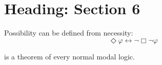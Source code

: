 \documentclass[12pt]{article}
\theoremstyle{plain}
\theoremstyle{ospaicdefinition}
\newcommand{\Necessarily}{\Box}
\newcommand{\Possibly}{\Diamond}
\begin{document}
\section{Heading: Section 6}\label{sec:six}
Possibility can be defined from necessity:
\begin{equation}\label{eq:duality}
	\Possibly\varphi \leftrightarrow \neg\Necessarily\neg\varphi
\end{equation}

\noindent {} is a theorem of every normal modal logic.

\printbibliography
\end{document}
